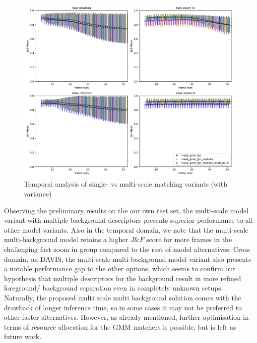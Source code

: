 \begin{figure}[ht!]
    \centering
    \includegraphics[width=1.\linewidth]{figures/04_experiments/multires_comparisons/mask_gmm_fpn-mask_gmm_fpn_multires-mask_gmm_fpn_multires_multi_descr-movement_all_variance.pdf}
    \caption{Temporal analysis of single- vs multi-scale matching variants (with \\ variance)}
    \label{fig:multires_abl_all_multires}
    
\end{figure}
Observing the preliminary results on the our own test set, the multi-scale model variant with multiple background descriptors presents superior performance to all other model variants. Also in the temporal domain, we note that the multi-scale multi-background model retains a higher $J\&F$ score for more frames in the challenging fast zoom in group compared to the rest of model alternatives. Cross domain, on DAVIS, the multi-scale multi-background model variant also presents a notable performance gap to the other options, which seems to confirm our hypothesis that multiple descriptors for the background result in more refined foreground/ background separation even in completely unknown setups. Naturally, the proposed multi scale multi background solution comes with the drawback of longer inference time, so in some cases it may not be preferred to other faster alternatives. However, as already mentioned, further optimisation in terms of resource allocation for the GMM matchers is possible, but is left as future work. \par

